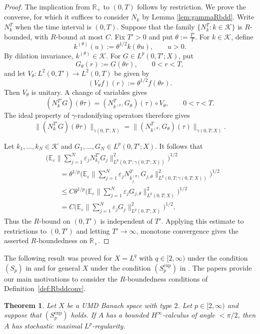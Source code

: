 \documentclass{amsart}
\let\leq\leqslant
\theoremstyle{plain}
\newtheorem{theorem}{Theorem}[section]
\theoremstyle{remark}
\theoremstyle{plain}
\numberwithin{equation}{section}
\newcommand{\R}{\mathbb R}
\newcommand{\E}{\mathbb E}
\newcommand{\1}{\mathbf 1}
\begin{document}
\begin{proof}
The implication from $\R_+$ to $(0,T)$ follows by restriction. We prove the converse, for which it suffices to consider $N_k$ by Lemma \ref{lem:gammaRbdd}.  Write $N_k^T$ when the time interval is $(0,T)$. Suppose that the family
$\{N_k^T:k\in\mathcal K\}$
is $R$-bounded, with $R$-bound at most $C$.
Fix $T'>0$ and put $\theta:=\frac{T'}{T}.$ For $k\in\mathcal K$, define
\[
        k^{(\theta)}(u):=\theta^{1/2}k(\theta u), \qquad u>0.
\]
By dilation invariance, $k^{(\theta)}\in\mathcal K$. For
$G\in L^p(0,T';X)$, put
\[
        G_\theta(r):=G(\theta r),
        \qquad 0<r<T,
\]
and let $V_\theta:L^2(0,T')\longrightarrow L^2(0,T)$ be given by
\[
        (V_\theta f)(r):=\theta^{1/2}f(\theta r).
\]
Then $V_\theta$ is unitary. A change of variables gives
\[
        (N_k^{T'}G)(\theta\tau)
        =
        (N_{k^{(\theta)}}^TG_\theta)(\tau)\circ V_\theta,
        \qquad 0<\tau<T.
\]
The ideal property of $\gamma$-radonifying operators therefore gives
\[
        \|(N_k^{T'}G)(\theta\tau)\|_{\gamma(0,T';X)}
        =
        \|(N_{k^{(\theta)}}^TG_\theta)(\tau)\|_{\gamma(0,T;X)}.
\]

Let $k_1,\ldots,k_N\in\mathcal K$ and
$G_1,\ldots,G_N\in L^p(0,T';X)$. It follows that
\[
\begin{aligned}
&\Big(
\E_\varepsilon
\Big\|
\sum_{j=1}^N\varepsilon_jN_{k_j}^{T'}G_j
\Big\|_{L^p(0,T';\gamma(0,T';X))}^2
\Big)^{1/2}
\\
&\qquad
=
\theta^{1/p}
\Big(
\E_\varepsilon
\Big\|
\sum_{j=1}^N
\varepsilon_jN_{k_j^{(\theta)}}^TG_{j,\theta}
\Big\|_{L^p(0,T;\gamma(0,T;X))}^2
\Big)^{1/2}
\\
&\qquad
\leq
C\theta^{1/p}
\Big(
\E_\varepsilon
\Big\|
\sum_{j=1}^N\varepsilon_jG_{j,\theta}
\Big\|_{L^p(0,T;X)}^2
\Big)^{1/2}
\\
&\qquad
=
C
\Big(
\E_\varepsilon
\Big\|
\sum_{j=1}^N\varepsilon_jG_j
\Big\|_{L^p(0,T';X)}^2
\Big)^{1/2}.
\end{aligned}
\]
Thus the $R$-bound on $(0,T')$ is independent of $T'$. Applying this estimate to restrictions to $(0,T')$ and letting $T'\to\infty$, monotone convergence gives the asserted $R$-boundedness on $\R_+$. 
\end{proof}

The following result was proved for $X = L^q$ with $q\in [2, \infty)$  under the condition $(S_p)$ in \cite{NVW-SMR} and for general $X$ under the condition $(S_p^{\exp})$ in \cite{NVW-survey}. 
The papers \cite{NVW-SMR,NVW-survey} provide our main motivations to consider the $R$-boundedness conditions of Definition~\ref{def:Rbddconv}.  
\begin{theorem}\label{thm:survey}
Let $X$ be a UMD Banach space with type $2$. Let $p\in [2, \infty)$ and suppose that $(S_p^{\exp})$ holds. If $A$ has a bounded $H^\infty$-calculus of angle $<\pi/2$, then $A$ has stochastic maximal $L^p$-regularity.
\end{theorem}
\end{document}
